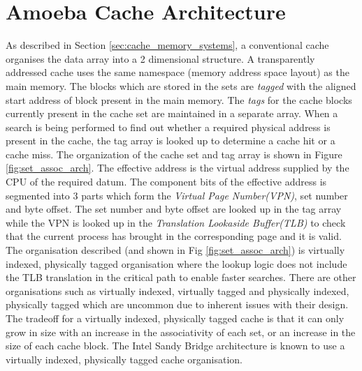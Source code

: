 %
%

\chapter{Amoeba Cache Architecture}
\label{chap:ac_architecture}

As described in Section \ref{sec:cache_memory_systems}, a conventional cache organises the data array into a 2 dimensional structure. A transparently addressed cache uses the same namespace (memory address space layout) as the main memory. The blocks which are stored in the sets are \textit{tagged} with the aligned start address of block present in the main memory. The \textit{tags} for the cache blocks currently present in the cache set are maintained in a separate array. When a search is being performed to find out whether a required physical address is present in the cache, the tag array is looked up to determine a cache hit or a cache miss. The organization of the cache set and tag array is shown in Figure \ref{fig:set_assoc_arch}. The effective address is the virtual address supplied by the CPU of the required datum. The component bits of the effective address is segmented into 3 parts which form the \textit{Virtual Page Number(VPN)}, set number and byte offset. The set number and byte offset are looked up in the tag array while the VPN is looked up in the \textit{Translation Lookaside Buffer(TLB)} to check that the current process has brought in the corresponding page and it is valid. The organisation described (and shown in Fig \ref{fig:set_assoc_arch}) is virtually indexed, physically tagged organisation where the lookup logic does not include the TLB translation in the critical path to enable faster searches. There are other organisations such as virtually indexed, virtually tagged and physically indexed, physically tagged which are uncommon due to inherent issues with their design. The tradeoff for a virtually indexed, physically tagged cache is that it can only grow in size with an increase in the associativity of each set, or an increase in the size of each cache block. The Intel Sandy Bridge architecture is known to use a virtually indexed, physically tagged cache organisation.




